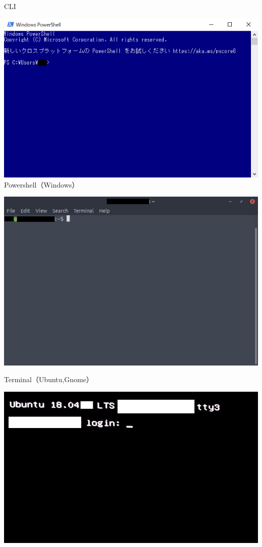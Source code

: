 \documentclass[12pt,aspectratio=169]{beamer}
\begin{document}
\begin{frame}{CLI}
\begin{minipage}{0.3\textwidth}
    \includegraphics[width=1.2\linewidth,bb=0 0 620 388]{./images/powershell.png}
    Powershell（Windows）
  \end{minipage}
  \hfill
  \begin{minipage}{0.3\textwidth}
    \includegraphics[width=\linewidth,bb=0 0 734 487]{./images/ubuntu-gnome.png}
    \begin{flushleft} \small Terminal（Ubuntu,Gnome） \end{flushleft}
    \includegraphics[width=\linewidth,bb=0 0 734 487]{./images/ubuntu-cli.jpg}

\end{minipage}
\end{frame}
\end{document}
